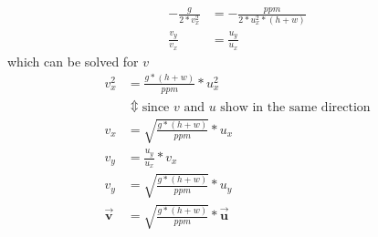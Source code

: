\documentclass[10pt]{article}
\begin{document}
\begin{align}
-\frac{g}{2*v_x^2}&=-\frac{ppm}{2*u_x^2*(h+w)}\\
\frac{v_y}{v_x}&=\frac{u_y}{u_x}
\end{align}
which can be solved for $v$
\begin{align}
v_x^2&=\frac{g*(h+w)}{ppm}*u_x^2\\
&\Updownarrow\text{since $v$ and $u$ show in the same direction}\\
v_x&=\sqrt{\frac{g*(h+w)}{ppm}}*u_x\\
v_y&=\frac{u_y}{u_x}*v_x\\
v_y&=\sqrt{\frac{g*(h+w)}{ppm}}*u_y\\
\boldsymbol{\vec{v}}&=\sqrt{\frac{g*(h+w)}{ppm}}*\boldsymbol{\vec{u}}
\end{align}
\end{document}
